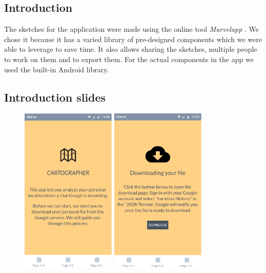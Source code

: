 \documentclass[12p]{article}
\begin{document}
		    \subsection{Introduction}
		    The sketches for the application were made using the online tool \textit{Marvelapp} \cite{Marvelapp}. We chose it because it has a varied library of pre-designed components which we were able to leverage to save time. It also allows sharing the sketches, multiple people to work on them and to export them.
		    For the actual components in the app we used the built-in Android library.
		    
    		\subsection{Introduction slides}
            \begin{figure}[ht]
                \includegraphics[height=8cm,keepaspectratio]{pics/app_design/intro.PNG}
        		\includegraphics[height=8cm,keepaspectratio]{pics/app_design/intro2.PNG}

\end{figure}
\end{document}
